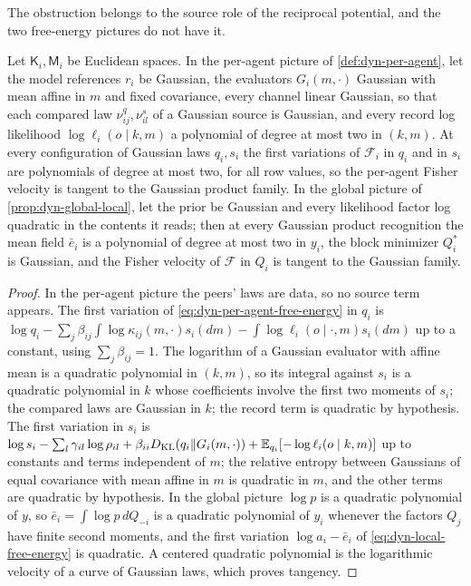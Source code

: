 The obstruction belongs to the source role of the reciprocal potential, and the two free-energy pictures do not have it.

Let $\mathsf K_i,\mathsf M_i$ be Euclidean spaces. In the per-agent picture of \cref{def:dyn-per-agent}, let the model references $r_i$ be Gaussian, the evaluators $G_i(m,\cdot)$ Gaussian with mean affine in $m$ and fixed covariance, every channel linear Gaussian, so that each compared law $\nu^q_{ij},\nu^s_{il}$ of a Gaussian source is Gaussian, and every record log likelihood $\log\ell_i(o\mid k,m)$ a polynomial of degree at most two in $(k,m)$. At every configuration of Gaussian laws $q_i,s_i$ the first variations of $\mathcal F_i$ in $q_i$ and in $s_i$ are polynomials of degree at most two, for all row values, so the per-agent Fisher velocity is tangent to the Gaussian product family. In the global picture of \cref{prop:dyn-global-local}, let the prior be Gaussian and every likelihood factor log quadratic in the contents it reads; then at every Gaussian product recognition the mean field $\bar e_i$ is a polynomial of degree at most two in $y_i$, the block minimizer $Q_i^*$ is Gaussian, and the Fisher velocity of $\mathcal F$ in $Q_i$ is tangent to the Gaussian family.
\begin{proof}
In the per-agent picture the peers' laws are data, so no source term appears. The first variation of \cref{eq:dyn-per-agent-free-energy} in $q_i$ is $\log q_i-\sum_j\beta_{ij}\int\log\kappa_{ij}(m,\cdot)s_i(dm)-\int\log\ell_i(o\mid\cdot,m)s_i(dm)$ up to a constant, using $\sum_j\beta_{ij}=1$. The logarithm of a Gaussian evaluator with affine mean is a quadratic polynomial in $(k,m)$, so its integral against $s_i$ is a quadratic polynomial in $k$ whose coefficients involve the first two moments of $s_i$; the compared laws are Gaussian in $k$; the record term is quadratic by hypothesis. The first variation in $s_i$ is $\log s_i-\sum_l\gamma_{il}\log\rho_{il}+\beta_{ii}D_{\mathrm{KL}}(q_i\Vert G_i(m,\cdot))+\mathbb E_{q_i}[-\log\ell_i(o\mid k,m)]$ up to constants and terms independent of $m$; the relative entropy between Gaussians of equal covariance with mean affine in $m$ is quadratic in $m$, and the other terms are quadratic by hypothesis. In the global picture $\log p$ is a quadratic polynomial of $y$, so $\bar e_i=\int\log p\,dQ_{-i}$ is a quadratic polynomial of $y_i$ whenever the factors $Q_j$ have finite second moments, and the first variation $\log a_i-\bar e_i$ of \cref{eq:dyn-local-free-energy} is quadratic. A centered quadratic polynomial is the logarithmic velocity of a curve of Gaussian laws, which proves tangency.
\end{proof}


